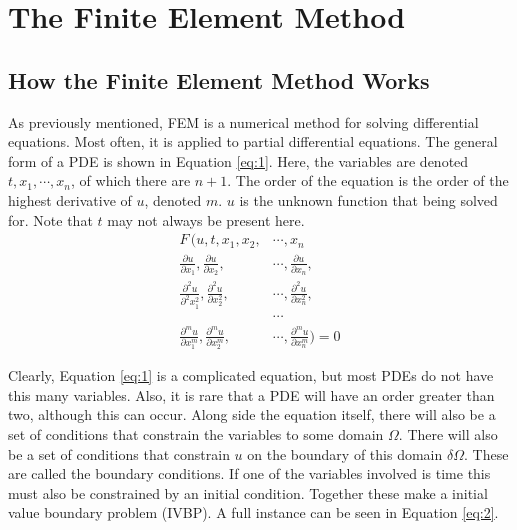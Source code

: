 
\pagebreak

\section{The Finite Element Method} \label{section:FEM}

\subsection{How the Finite Element Method Works} \label{subsection:howFEMworks}

As previously mentioned, FEM is a numerical method for solving differential equations. Most often, it is applied to partial differential equations. The general form of a PDE is shown in Equation \ref{eq:1}. Here, the variables are denoted $t, x_1, \cdots, x_n$, of which there are $n+1$. The order of the equation is the order of the highest derivative of $u$, denoted $m$. $u$ is the unknown function that being solved for. Note that $t$ may not always be present here.
\begin{align}\label{eq:1}
F \, \Big(u, t, x_1, x_2, &\cdots, x_n \nonumber \\
\frac{\partial u}{\partial x_1}, \frac{\partial u}{\partial x_2}, &\cdots, \frac{\partial u}{\partial x_n}, \nonumber \\ 
\frac{\partial^2 u}{\partial^2 x^2_1}, \frac{\partial^2 u}{\partial x^2_2}, &\cdots, \frac{\partial^2 u}{\partial x_n^2}, \\
&\cdots \nonumber \\
\frac{\partial^m u}{\partial x^m_1}, \frac{\partial^m u}{\partial x^m_2}, &\cdots, \frac{\partial^m u}{\partial x_n^m} \Big)= 0\nonumber
\end{align}

Clearly, Equation \ref{eq:1} is a complicated equation, but most PDEs do not have this many variables. Also, it is rare that a PDE will have an order greater than two, although this can occur. Along side the equation itself, there will also be a set of conditions that constrain the variables to some domain $\Omega$. There will also be a set of conditions that constrain $u$ on the boundary of this domain $\delta \Omega$. These are called the boundary conditions. If one of the variables involved is time this must also be constrained by an initial condition. Together these make a initial value boundary problem (IVBP). A full instance can be seen in Equation \ref{eq:2}.

